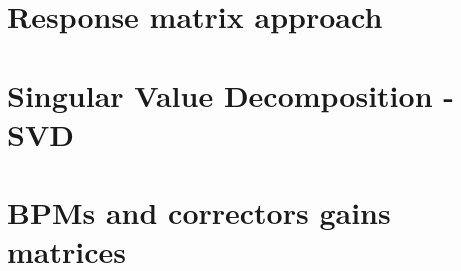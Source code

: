 \appendix

\chapter{Response matrix approach}

\chapter{Singular Value Decomposition - SVD}

\chapter{BPMs and correctors gains matrices}